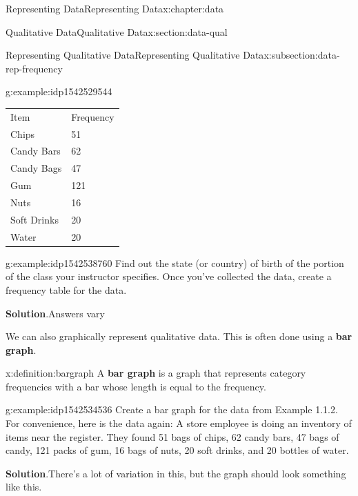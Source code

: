 \documentclass[oneside,10pt,]{book}
\newcommand{\blocktitlefont}{\relax}
\newcommand{\tabularfont}{\relax}
\newcommand{\terminology}[1]{\textbf{#1}}
\begin{document}
\begin{chapterptx}{Representing Data}{}{Representing Data}{}{}{x:chapter:data}
\begin{sectionptx}{Qualitative Data}{}{Qualitative Data}{}{}{x:section:data-qual}
\begin{subsectionptx}{Representing Qualitative Data}{}{Representing Qualitative Data}{}{}{x:subsection:data-rep-frequency}
\begin{example}{}{g:example:idp1542529544}
\begin{center}
{\tabularfont%
\begin{tabular}{ll}
Item&Frequency\tabularnewline[0pt]
Chips&51\tabularnewline[0pt]
Candy Bars&62\tabularnewline[0pt]
Candy Bags&47\tabularnewline[0pt]
Gum&121\tabularnewline[0pt]
Nuts&16\tabularnewline[0pt]
Soft Drinks&20\tabularnewline[0pt]
Water&20
\end{tabular}
}%
\end{center}%
%
\end{example}
\begin{example}{}{g:example:idp1542538760}%
Find out the state (or country) of birth of the portion of the class your instructor specifies.  Once you've collected the data, create a frequency table for the data.%
\par\smallskip%
\noindent\textbf{\blocktitlefont Solution}.\hypertarget{g:solution:idp1542535432}{}\quad{}Answers vary%
\end{example}
We can also graphically represent qualitative data.  This is often done using a \terminology{bar graph}.%
\begin{definition}{}{x:definition:bargraph}%
A \terminology{bar graph} is a graph that represents category frequencies with a bar whose length is equal to the frequency.%
%
\end{definition}
\begin{example}{}{g:example:idp1542534536}%
Create a bar graph for the data from Example 1.1.2.  For convenience, here is the data again: A store employee is doing an inventory of items near the register.  They found 51 bags of chips, 62 candy bars, 47 bags of candy, 121 packs of gum, 16 bags of nuts, 20 soft drinks, and 20 bottles of water.%
\par\smallskip%
\noindent\textbf{\blocktitlefont Solution}.\hypertarget{g:solution:idp1542532744}{}\quad{}There's a lot of variation in this, but the graph should look something like this.%
\par
\begin{image}{0}{1}{0}%
%
\end{image}%

\end{example}
\end{subsectionptx}
\end{sectionptx}
\end{chapterptx}
\end{document}
